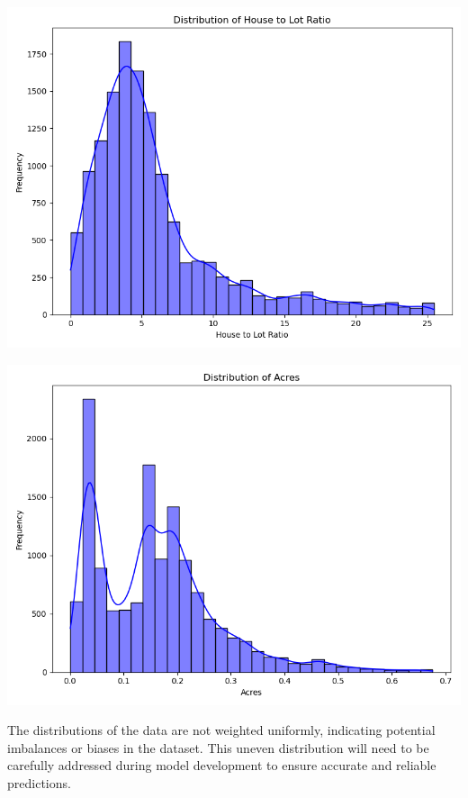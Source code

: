 \begin{minipage}[t]{0.3\textwidth}
	\centering
	\includegraphics[width=\linewidth]{
		Sections/ratio_distribution.png
	} %
\end{minipage}%
\hfill
\begin{minipage}[t]{0.3\textwidth}
	\centering
	\includegraphics[width=\linewidth]{
		Sections/acre_distribution.png
	} %
\end{minipage}

The distributions of the data are not weighted uniformly, indicating potential imbalances
or biases in the dataset. This uneven distribution will need to be carefully
addressed during model development to ensure accurate and reliable predictions.

